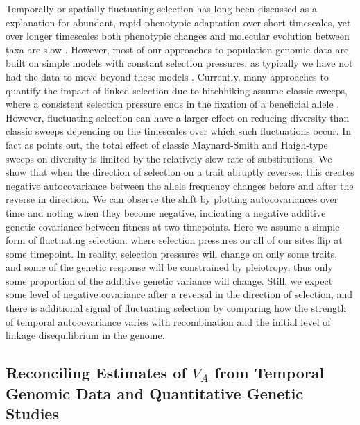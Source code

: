 \documentclass[11pt]{article}
\begin{document}
Temporally or spatially fluctuating selection has long been discussed as a
explanation for abundant, rapid phenotypic adaptation over short timescales,
yet over longer timescales both phenotypic changes and molecular evolution
between taxa are slow \parencite{Messer2016-mn,Hendry1999-zu,Gingerich1983-cc}.
However, most of our approaches to population genomic data are built on simple
models with constant selection pressures, as typically we have not had the data
to move beyond these models \parencite{Messer2016-mn}. Currently, many
approaches to quantify the impact of linked selection due to hitchhiking assume
classic sweeps, where a consistent selection pressure ends in the fixation of a
beneficial allele \parencite{Sella2009-rf,Hernandez2011-gs,Wiehe1993-ja}.
However, fluctuating selection can have a larger effect on reducing diversity
than classic sweeps \parencite{Barton2000-zg} depending on the timescales over
which such fluctuations occur. In fact as \textcite{Barton2000-zg} points out,
the total effect of classic Maynard-Smith and Haigh-type sweeps on diversity is
limited by the relatively slow rate of substitutions. We show that when the
direction of selection on a trait abruptly reverses, this creates negative
autocovariance between the allele frequency changes before and after the
reverse in direction. We can observe the shift by plotting autocovariances over
time and noting when they become negative, indicating a negative additive
genetic covariance between fitness at two timepoints. Here we assume a simple
form of fluctuating selection: where selection pressures on all of our sites
flip at some timepoint. In reality, selection pressures will change on only
some traits, and some of the genetic response will be constrained by
pleiotropy, thus only some proportion of the additive genetic variance will
change. Still, we expect some level of negative covariance after a reversal in
the direction of selection, and there is additional signal of fluctuating
selection by comparing how the strength of temporal autocovariance varies with
recombination and the initial level of linkage disequilibrium in the genome.

\subsection{Reconciling Estimates of $V_A$ from Temporal Genomic Data and
Quantitative Genetic Studies}
\end{document}
